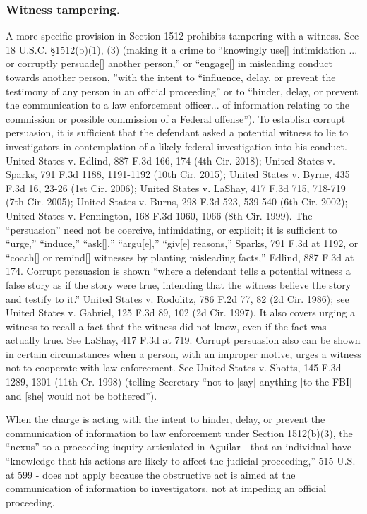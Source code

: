 \subsubsection*{Witness tampering.}
A more specific provision in Section 1512 prohibits tampering with a witness. 
See 18 U.S.C. \S 1512(b)(1), (3) (making it a crime to “knowingly use[] intimidation ... or corruptly persuade[] another person,” or “engage[] in misleading conduct towards another person, ”with the intent to “influence, delay, or prevent the testimony of any person in an official proceeding” or to “hinder, delay, or prevent the communication to a law enforcement officer... of information relating to the commission or possible commission of a Federal offense”). 
To establish corrupt persuasion, it is sufficient that the defendant asked a potential witness to lie to investigators in contemplation of a likely federal investigation into his conduct. 
United States v. Edlind, 887 F.3d 166, 174 (4th Cir. 2018); 
United States v. Sparks, 791 F.3d 1188, 1191-1192 (10th Cir. 2015); 
United States v. Byrne, 435 F.3d 16, 23-26 (1st Cir. 2006); 
United States v. LaShay, 417 F.3d 715, 718-719 (7th Cir. 2005); 
United States v. Burns, 298 F.3d 523, 539-540 (6th Cir. 2002); 
United States v. Pennington, 168 F.3d 1060, 1066 (8th Cir. 1999). 
The “persuasion” need not be coercive, intimidating, or explicit; 
it is sufficient to “urge,” “induce,” “ask[],” “argu[e],” “giv[e] reasons,” Sparks, 791 F.3d at 1192, or “coach[] or remind[] witnesses by planting misleading facts,” Edlind, 887 F.3d at 174. 
Corrupt persuasion is shown “where a defendant tells a potential witness a false story as if the story were true, intending that the witness believe the story and testify to it.” 
United States v. Rodolitz, 786 F.2d 77, 82 (2d Cir. 1986); 
see United States v. Gabriel, 125 F.3d 89, 102 (2d Cir. 1997). 
It also covers urging a witness to recall a fact that the witness did not know, even if the fact was actually true. 
See LaShay, 417 F.3d at 719. 
Corrupt persuasion also can be shown in certain circumstances when a person, with an improper motive, urges a witness not to cooperate with law enforcement. 
See United States v. Shotts, 145 F.3d 1289, 1301 (11th Cr. 1998) (telling Secretary “not to [say] anything [to the FBI] and [she] would not be bothered”). 

When the charge is acting with the intent to hinder, delay, or prevent the communication of information to law enforcement under Section 1512(b)(3), the “nexus” to a proceeding inquiry articulated in Aguilar - that an individual have “knowledge that his actions are likely to affect the judicial proceeding,” 515 U.S. at 599 - does not apply because the obstructive act is aimed at the communication of information to investigators, not at impeding an official proceeding. 

